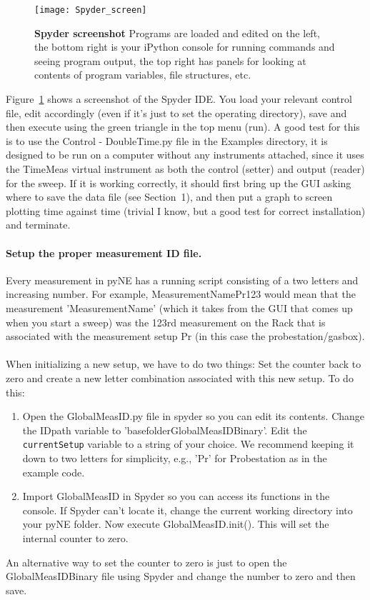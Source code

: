 \begin{figure}[h]
\texttt{[image: Spyder\_screen]}
\caption{\textbf{Spyder screenshot} Programs are loaded and edited on the left, the bottom right is your iPython console for running commands and seeing program output, the top right has panels for looking at contents of program variables, file structures, etc.}
\label{Fig:Spyderscreen}
\end{figure}

Figure~\ref{Fig:Spyderscreen} shows a screenshot of the Spyder IDE. You load your relevant control file, edit accordingly (even if it's just to set the operating directory), save and then execute using the green triangle in the top menu (run). A good test for this is to use the Control - DoubleTime.py file in the Examples directory, it is designed to be run on a computer without any instruments attached, since it uses the TimeMeas virtual instrument as both the control (setter) and output (reader) for the sweep. If it is working correctly, it should first bring up the GUI asking where to save the data file (see Section~1), and then put a graph to screen plotting time against time (trivial I know, but a good test for correct installation) and terminate.

\paragraph*{Setup the proper measurement ID file.}
Every measurement in pyNE has a running script consisting of a two letters and increasing number. For example, MeasurementNamePr123 would mean that the measurement 'MeasurementName' (which it takes from the GUI that comes up when you start a sweep) was the 123rd measurement on the Rack that is associated with the measurement setup Pr (in this case the probestation/gasbox).\\
\\
When initializing a new setup, we have to do two things: Set the counter back to zero and create a new letter combination associated with this new setup. To do this:\\
\begin{enumerate}
\item Open the GlobalMeasID.py file in spyder so you can edit its contents. Change the IDpath variable to 'basefolder\setminus GlobalMeasIDBinary'. Edit the \texttt{currentSetup} variable to a string of your choice. We recommend keeping it down to two letters for simplicity, e.g., 'Pr' for Probestation as in the example code.
\item Import GlobalMeasID in Spyder so you can access its functions in the console. If Spyder can't locate it, change the current working directory into your pyNE folder. Now execute GlobalMeasID.init(). This will set the internal counter to zero.
\end{enumerate}

An alternative way to set the counter to zero is just to open the GlobalMeasIDBinary file using Spyder and change the number to zero and then save. 